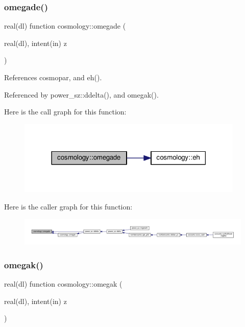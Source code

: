 \subsubsection{\texorpdfstring{omegade()}{omegade()}}
{\footnotesize\ttfamily real(dl) function cosmology\+::omegade (\begin{DoxyParamCaption}\item[{real(dl), intent(in)}]{z }\end{DoxyParamCaption})}



References cosmopar, and eh().



Referenced by power\+\_\+sz\+::ddelta(), and omegak().

Here is the call graph for this function\+:
\nopagebreak
\begin{figure}[H]
\begin{center}
\leavevmode
\includegraphics[width=306pt]{namespacecosmology_a81af36db5e915a16bc6684c70562c2cc_cgraph}
\end{center}
\end{figure}
Here is the caller graph for this function\+:
\nopagebreak
\begin{figure}[H]
\begin{center}
\leavevmode
\includegraphics[width=350pt]{namespacecosmology_a81af36db5e915a16bc6684c70562c2cc_icgraph}
\end{center}
\end{figure}
\mbox{\label{namespacecosmology_ac8a5367c45bf7773b9a8e27fb7ff59ec}} 
\subsubsection{\texorpdfstring{omegak()}{omegak()}}
{\footnotesize\ttfamily real(dl) function cosmology\+::omegak (\begin{DoxyParamCaption}\item[{real(dl), intent(in)}]{z }\end{DoxyParamCaption})}



